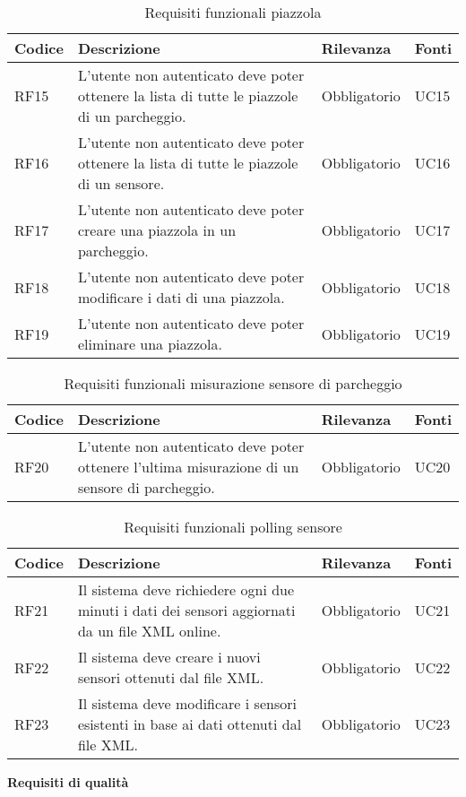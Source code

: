 \begin{table}[H]
    \begin{tabular}{|p{1cm}|p{6cm}|p{1.9cm}|p{1.8cm}|} 
    \hline
    Codice & Descrizione & Rilevanza &  Fonti \\ 
    \hline
    RF15 & L'utente non autenticato deve poter ottenere la lista di tutte le piazzole di un parcheggio. & Obbligatorio & UC15 \\ 
    \hline
    RF16 & L'utente non autenticato deve poter ottenere la lista di tutte le piazzole di un sensore. & Obbligatorio & UC16 \\ 
    \hline
    RF17 & L'utente non autenticato deve poter creare una piazzola in un parcheggio. & Obbligatorio & UC17 \\ 
    \hline
    RF18 & L'utente non autenticato deve poter modificare i dati di una piazzola. & Obbligatorio & UC18 \\
    \hline
    RF19 & L'utente non autenticato deve poter eliminare una piazzola. & Obbligatorio & UC19 \\
    \hline
    \end{tabular}
    \caption{Requisiti funzionali piazzola}
\end{table}

\begin{table}[H]
    \begin{tabular}{|p{1cm}|p{6cm}|p{1.9cm}|p{1.8cm}|} 
    \hline
    Codice & Descrizione & Rilevanza &  Fonti \\ 
    \hline
    RF20 & L'utente non autenticato deve poter ottenere l'ultima misurazione di un sensore di parcheggio. & Obbligatorio & UC20 \\ 
    \hline
    \end{tabular}
    \caption{Requisiti funzionali misurazione sensore di parcheggio}
\end{table}

\begin{table}[H]
    \begin{tabular}{|p{1cm}|p{6cm}|p{1.9cm}|p{1.8cm}|} 
    \hline
    Codice & Descrizione & Rilevanza &  Fonti \\ 
    \hline
    RF21 & Il sistema deve richiedere ogni due minuti i dati dei sensori aggiornati da un file \gls{XML} online. & Obbligatorio & UC21 \\ 
    \hline
    RF22 & Il sistema deve creare i nuovi sensori ottenuti dal file \gls{XML}. & Obbligatorio & UC22 \\ 
    \hline
    RF23 & Il sistema deve modificare i sensori esistenti in base ai dati ottenuti dal file \gls{XML}. & Obbligatorio & UC23 \\ 
    \hline
    \end{tabular}
    \caption{Requisiti funzionali polling sensore}
\end{table}
\leavevmode\newline
\textbf{Requisiti di qualità}

